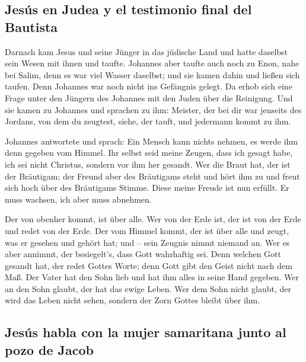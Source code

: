 \hypertarget{jesuxfas-en-judea-y-el-testimonio-final-del-bautista}{%
\subsection{Jesús en Judea y el testimonio final del
Bautista}\label{jesuxfas-en-judea-y-el-testimonio-final-del-bautista}}

 Darnach kam Jesus und seine Jünger in das jüdische Land
und hatte daselbst sein Wesen mit ihnen und taufte. 
Johannes aber taufte auch noch zu Enon, nahe bei Salim, denn es war viel
Wasser daselbst; und sie kamen dahin und ließen sich taufen.
 Denn Johannes war noch nicht ins Gefängnis gelegt.
 Da erhob sich eine Frage unter den Jüngern des Johannes
mit den Juden über die Reinigung.  Und sie kamen zu
Johannes und sprachen zu ihm: Meister, der bei dir war jenseits des
Jordans, von dem du zeugtest, siehe, der tauft, und jedermann kommt zu
ihm.

 Johannes antwortete und sprach: Ein Mensch kann nichts
nehmen, es werde ihm denn gegeben vom Himmel.  Ihr selbst
seid meine Zeugen, dass ich gesagt habe, ich sei nicht Christus, sondern
vor ihm her gesandt.  Wer die Braut hat, der ist der
Bräutigam; der Freund aber des Bräutigams steht und hört ihm zu und
freut sich hoch über des Bräutigams Stimme. Diese meine Freude ist nun
erfüllt.  Er muss wachsen, ich aber muss abnehmen.

 Der von obenher kommt, ist über alle. Wer von der Erde
ist, der ist von der Erde und redet von der Erde. Der vom Himmel kommt,
der ist über alle  und zeugt, was er gesehen und gehört
hat; und -- sein Zeugnis nimmt niemand an.  Wer es aber
annimmt, der besiegelt's, dass Gott wahrhaftig sei.  Denn
welchen Gott gesandt hat, der redet Gottes Worte; denn Gott gibt den
Geist nicht nach dem Maß.  Der Vater hat den Sohn lieb
und hat ihm alles in seine Hand gegeben.  Wer an den Sohn
glaubt, der hat das ewige Leben. Wer dem Sohn nicht glaubt, der wird das
Leben nicht sehen, sondern der Zorn Gottes bleibt über ihm.

\hypertarget{jesuxfas-habla-con-la-mujer-samaritana-junto-al-pozo-de-jacob}{%
\subsection{Jesús habla con la mujer samaritana junto al pozo de
Jacob}\label{jesuxfas-habla-con-la-mujer-samaritana-junto-al-pozo-de-jacob}}

